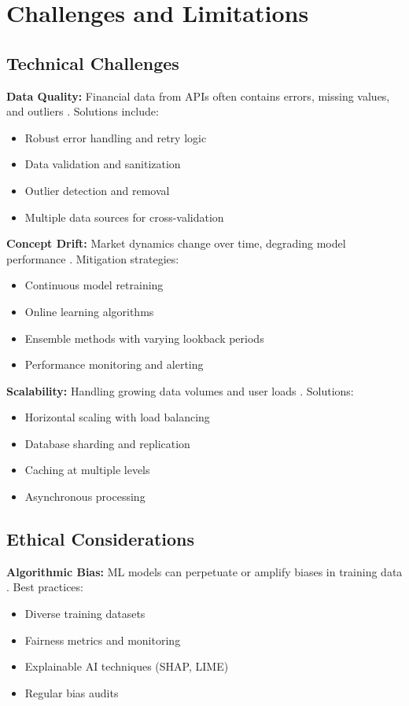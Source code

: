 \documentclass[conference]{IEEEtran}
\begin{document}
\section{Challenges and Limitations}

\subsection{Technical Challenges}

\textbf{Data Quality:} Financial data from APIs often contains errors, missing values, and outliers \cite{patel2020feature}. Solutions include:
\begin{itemize}
    \item Robust error handling and retry logic
    \item Data validation and sanitization
    \item Outlier detection and removal
    \item Multiple data sources for cross-validation
\end{itemize}

\textbf{Concept Drift:} Market dynamics change over time, degrading model performance \cite{li2022deep}. Mitigation strategies:
\begin{itemize}
    \item Continuous model retraining
    \item Online learning algorithms
    \item Ensemble methods with varying lookback periods
    \item Performance monitoring and alerting
\end{itemize}

\textbf{Scalability:} Handling growing data volumes and user loads \cite{johnson2023architecture}. Solutions:
\begin{itemize}
    \item Horizontal scaling with load balancing
    \item Database sharding and replication
    \item Caching at multiple levels
    \item Asynchronous processing
\end{itemize}

\subsection{Ethical Considerations}

\textbf{Algorithmic Bias:} ML models can perpetuate or amplify biases in training data \cite{abraham2021sentiment}. Best practices:
\begin{itemize}
    \item Diverse training datasets
    \item Fairness metrics and monitoring
    \item Explainable AI techniques (SHAP, LIME)
    \item Regular bias audits
\end{itemize}
\end{document}
